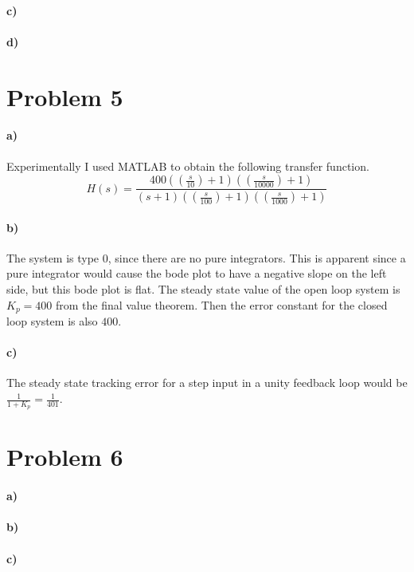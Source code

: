 \documentclass[12pt]{article}
\begin{document}
\paragraph{c)}

\paragraph{d)}

\section*{Problem 5}

\paragraph{a)}

Experimentally I used MATLAB to obtain the following transfer function.
\[H(s)=\frac{400\left(\left(\frac{s}{10}\right)+1\right)\left(\left(\frac{s}{10000}\right)+1\right)}{(s+1)\left(\left(\frac{s}{100}\right)+1\right)\left(\left(\frac{s}{1000}\right)+1\right)}\]

\paragraph{b)}

The system is type 0, since there are no pure integrators. This is apparent since a pure integrator would cause the bode plot to have a negative slope on the left side, but this
bode plot is flat. The steady state value of the open loop system is \(K_p=400\) from the final value theorem. Then the error constant for the closed loop
system is also \(400\).

\paragraph{c)}

The steady state tracking error for a step input in a unity feedback loop would be \(\frac{1}{1+K_p}=\frac{1}{401}\).

\section*{Problem 6}

\paragraph{a)}

\paragraph{b)}

\paragraph{c)}
\end{document}
